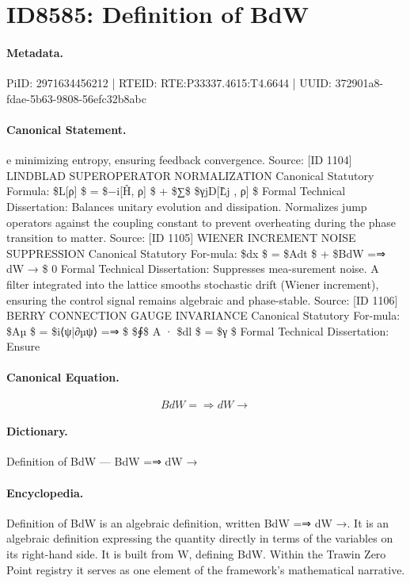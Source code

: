 \section*{ID8585: Definition of BdW}
\paragraph{Metadata.}
PiID: 2971634456212 | RTEID: RTE:P33337.4615:T4.6644 | UUID: 372901a8-fdae-5b63-9808-56efc32b8abc

\paragraph{Canonical Statement.}
e minimizing entropy, ensuring feedback convergence. Source: [ID 1104] LINDBLAD SUPEROPERATOR NORMALIZATION Canonical Statutory Formula: \$L[ρ] \$ = \$−i[Ĥ, ρ] \$ + \$∑\$ \$γjD[L̂j , ρ] \$ Formal Technical Dissertation: Balances unitary evolution and dissipation. Normalizes jump operators against the coupling constant to prevent overheating during the phase transition to matter. Source: [ID 1105] WIENER INCREMENT NOISE SUPPRESSION Canonical Statutory For-mula: \$dx \$ = \$Adt \$ + \$BdW =⇒ dW → \$ 0 Formal Technical Dissertation: Suppresses mea-surement noise. A filter integrated into the lattice smooths stochastic drift (Wiener increment), ensuring the control signal remains algebraic and phase-stable. Source: [ID 1106] BERRY CONNECTION GAUGE INVARIANCE Canonical Statutory For-mula: \$Aµ \$ = \$i⟨ψ|∂µψ⟩ =⇒ \$ \$∮\$ A · \$dl \$ = \$γ \$ Formal Technical Dissertation: Ensure

\paragraph{Canonical Equation.}
\[
BdW =⇒ dW →
\]

\paragraph{Dictionary.}
Definition of BdW — BdW =⇒ dW →

\paragraph{Encyclopedia.}
Definition of BdW is an algebraic definition, written BdW =⇒ dW →. It is an algebraic definition expressing the quantity directly in terms of the variables on its right-hand side. It is built from W, defining BdW. Within the Trawin Zero Point registry it serves as one element of the framework's mathematical narrative.
